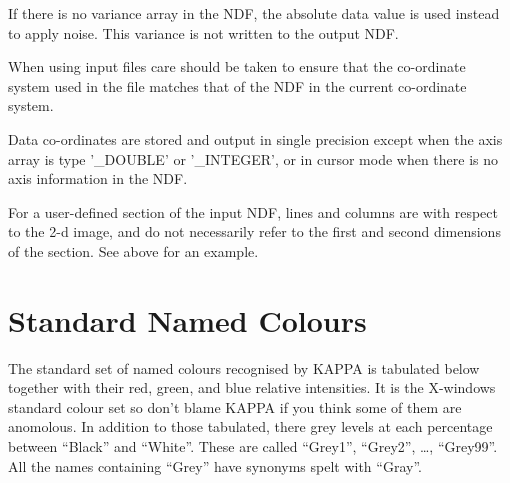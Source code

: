 {{{{         \sstitem
         If there is no variance array in the NDF, the absolute data
         value is used instead to apply noise.  This variance is not
         written to the output NDF.

         \sstitem
         When using input files care should be taken to ensure that
         the co-ordinate system used in the file matches that of the NDF
         in the current co-ordinate system.

         \sstitem
         Data co-ordinates are stored and output in single precision
         except when the axis array is type '\_DOUBLE' or '\_INTEGER', or
         in cursor mode when there is no axis information in the NDF.

         \sstitem
         For a user-defined section of the input NDF, lines and columns
         are with respect to the 2-d image, and do not necessarily refer to
         the first and second dimensions of the section.  See above for an
         example.
      }
   }
}

\newpage
\section{Standard Named Colours}
\label{ap:colset}
The standard set of named colours recognised by {\small KAPPA} is
tabulated below together with their red, green, and blue relative
intensities.  It is the X-windows standard colour set so don't blame
{\small KAPPA} if you think some of them are anomolous.  In addition to
those tabulated, there grey levels at each percentage between ``Black''
and ``White''.  These are called ``Grey1'', ``Grey2'', \dots, ``Grey99''.
All the names containing ``Grey'' have synonyms spelt with ``Gray''. 
\medskip

}
